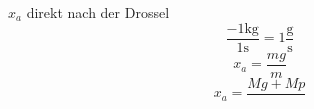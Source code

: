 

\item[c)] \( x_a \) direkt nach der Drossel
    \[
    \frac{-1 \text{kg}}{1 \text{s}} = 1 \frac{\text{g}}{\text{s}}
    \]
    \[
    x_a = \frac{mg}{m}
    \]
    \[
    x_a = \frac{Mg + Mp}{}
    \]